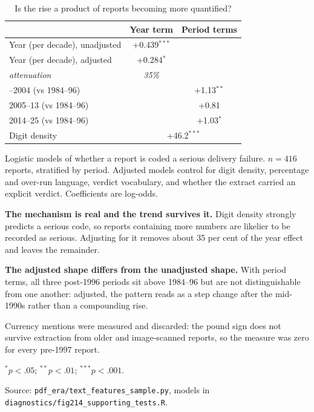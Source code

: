 \begin{table}[htbp]\centering
\begin{threeparttable}
\caption{Is the rise a product of reports becoming more quantified?}
\begin{tabular}{lcc}
\toprule
 & Year term & Period terms \\
\midrule
Year (per decade), unadjusted & +0.439$^{***}$ & \\
Year (per decade), adjusted & +0.284$^{*}$ & \\
\quad \emph{attenuation} & \emph{35\%} & \\
\addlinespace
1997--2004 (vs 1984--96) & & +1.13$^{**}$ \\
2005--13 (vs 1984--96) & & +0.81 \\
2014--25 (vs 1984--96) & & +1.03$^{*}$ \\
\addlinespace
Digit density & \multicolumn{2}{c}{+46.2$^{***}$} \\
\bottomrule
\end{tabular}
\begin{tablenotes}[flushleft]\footnotesize
\item Logistic models of whether a report is coded a serious delivery failure. $n=416$ reports,
stratified by period. Adjusted models control for digit density, percentage and over-run language,
verdict vocabulary, and whether the extract carried an explicit verdict. Coefficients are log-odds.
\item \textbf{The mechanism is real and the trend survives it.} Digit density strongly predicts a
serious code, so reports containing more numbers are likelier to be recorded as serious. Adjusting
for it removes about 35 per cent of the year effect and leaves the remainder.
\item \textbf{The adjusted shape differs from the unadjusted shape.} With period terms, all three
post-1996 periods sit above 1984--96 but are not distinguishable from one another: adjusted, the
pattern reads as a step change after the mid-1990s rather than a compounding rise.
\item Currency mentions were measured and discarded: the pound sign does not survive extraction
from older and image-scanned reports, so the measure was zero for every pre-1997 report.
\item $^{*}p<.05$; $^{**}p<.01$; $^{***}p<.001$.
\item Source: \texttt{pdf\_era/text\_features\_sample.py}, models in
\texttt{diagnostics/fig214\_supporting\_tests.R}.
\end{tablenotes}
\end{threeparttable}
\label{tab:ch02naoquant}
\end{table}
